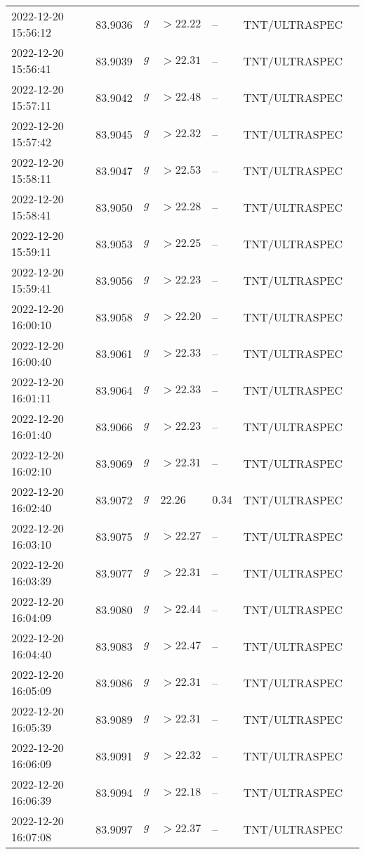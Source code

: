 \documentclass{nature_plusfigure}
\begin{document}
\begin{supplement}
\begin{center}
\begin{longtable}{lllllll}
2022-12-20 15:56:12 & 83.9036 & $g$ & $>22.22$ & -- & TNT/ULTRASPEC &  \\ 
2022-12-20 15:56:41 & 83.9039 & $g$ & $>22.31$ & -- & TNT/ULTRASPEC &  \\ 
2022-12-20 15:57:11 & 83.9042 & $g$ & $>22.48$ & -- & TNT/ULTRASPEC &  \\ 
2022-12-20 15:57:42 & 83.9045 & $g$ & $>22.32$ & -- & TNT/ULTRASPEC &  \\ 
2022-12-20 15:58:11 & 83.9047 & $g$ & $>22.53$ & -- & TNT/ULTRASPEC &  \\ 
2022-12-20 15:58:41 & 83.9050 & $g$ & $>22.28$ & -- & TNT/ULTRASPEC &  \\ 
2022-12-20 15:59:11 & 83.9053 & $g$ & $>22.25$ & -- & TNT/ULTRASPEC &  \\ 
2022-12-20 15:59:41 & 83.9056 & $g$ & $>22.23$ & -- & TNT/ULTRASPEC &  \\ 
2022-12-20 16:00:10 & 83.9058 & $g$ & $>22.20$ & -- & TNT/ULTRASPEC &  \\ 
2022-12-20 16:00:40 & 83.9061 & $g$ & $>22.33$ & -- & TNT/ULTRASPEC &  \\ 
2022-12-20 16:01:11 & 83.9064 & $g$ & $>22.33$ & -- & TNT/ULTRASPEC &  \\ 
2022-12-20 16:01:40 & 83.9066 & $g$ & $>22.23$ & -- & TNT/ULTRASPEC &  \\ 
2022-12-20 16:02:10 & 83.9069 & $g$ & $>22.31$ & -- & TNT/ULTRASPEC &  \\ 
2022-12-20 16:02:40 & 83.9072 & $g$ & $22.26$ & $0.34$ & TNT/ULTRASPEC &  \\ 
2022-12-20 16:03:10 & 83.9075 & $g$ & $>22.27$ & -- & TNT/ULTRASPEC &  \\ 
2022-12-20 16:03:39 & 83.9077 & $g$ & $>22.31$ & -- & TNT/ULTRASPEC &  \\ 
2022-12-20 16:04:09 & 83.9080 & $g$ & $>22.44$ & -- & TNT/ULTRASPEC &  \\ 
2022-12-20 16:04:40 & 83.9083 & $g$ & $>22.47$ & -- & TNT/ULTRASPEC &  \\ 
2022-12-20 16:05:09 & 83.9086 & $g$ & $>22.31$ & -- & TNT/ULTRASPEC &  \\ 
2022-12-20 16:05:39 & 83.9089 & $g$ & $>22.31$ & -- & TNT/ULTRASPEC &  \\ 
2022-12-20 16:06:09 & 83.9091 & $g$ & $>22.32$ & -- & TNT/ULTRASPEC &  \\ 
2022-12-20 16:06:39 & 83.9094 & $g$ & $>22.18$ & -- & TNT/ULTRASPEC &  \\ 
2022-12-20 16:07:08 & 83.9097 & $g$ & $>22.37$ & -- & TNT/ULTRASPEC &  \\ 

\end{longtable}
\end{center}
\end{supplement}
\end{document}
